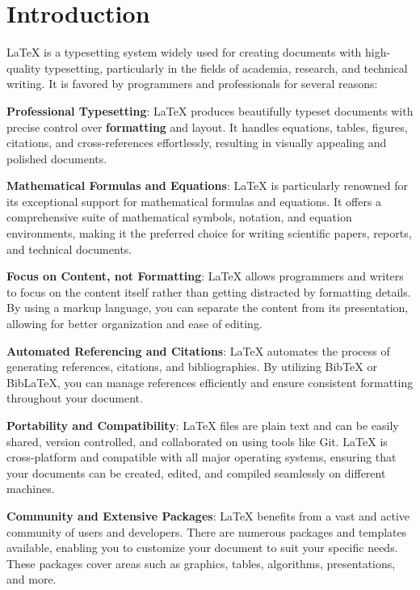 \documentclass[12pt]{article}
\begin{document}
	
	
	\tableofcontents
	\clearpage
	
	
	\section{Introduction}
	
	LaTeX is a typesetting system widely used for creating documents with high-quality typesetting, particularly in the fields of academia, research, and technical writing. It is favored by programmers and professionals for several reasons:
	
    \textbf{Professional Typesetting}: LaTeX produces beautifully typeset documents with precise control over \textbf{formatting} and layout. It handles equations, tables, figures, citations, and cross-references effortlessly, resulting in visually appealing and polished documents.
	
	\textbf{Mathematical Formulas and Equations}: LaTeX is particularly renowned for its exceptional support for mathematical formulas and equations. It offers a comprehensive suite of mathematical symbols, notation, and equation environments, making it the preferred choice for writing scientific papers, reports, and technical documents.
	
	\textbf{Focus on Content, not Formatting}: LaTeX allows programmers and writers to focus on the content itself rather than getting distracted by formatting details. By using a markup language, you can separate the content from its presentation, allowing for better organization and ease of editing.
	
	\textbf{Automated Referencing and Citations}: LaTeX automates the process of generating references, citations, and bibliographies. By utilizing BibTeX or BibLaTeX, you can manage references efficiently and ensure consistent formatting throughout your document.
	
	\textbf{Portability and Compatibility}: LaTeX files are plain text and can be easily shared, version controlled, and collaborated on using tools like Git. LaTeX is cross-platform and compatible with all major operating systems, ensuring that your documents can be created, edited, and compiled seamlessly on different machines.
	
	\textbf{Community and Extensive Packages}: LaTeX benefits from a vast and active community of users and developers. There are numerous packages and templates available, enabling you to customize your document to suit your specific needs. These packages cover areas such as graphics, tables, algorithms, presentations, and more.
	
\end{document}
